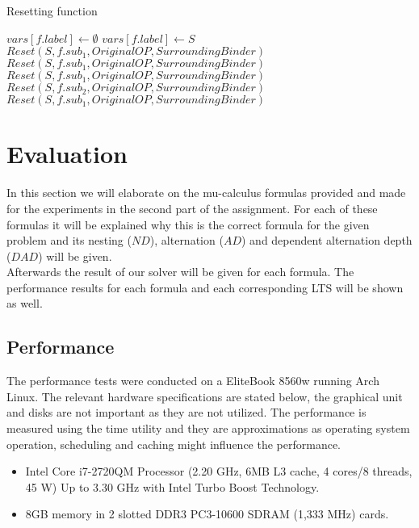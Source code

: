 \documentclass[10pt,a4paper]{article}
\begin{document}
\begin{algorithm}[H]
\caption{Resetting function}\label{alg:reset-proc}
\begin{algorithmic}[1]
					\State $vars[f.label] \gets \emptyset$
				\Else
					\State $vars[f.label] \gets S$
				\EndIf
				\State $Reset(S, f.sub_1, OriginalOP, SurroundingBinder)$
			\Else
				\State $Reset(S, f.sub_1, OriginalOP, SurroundingBinder)$
			\EndIf
		\Else
				\State $Reset(S, f.sub_1, OriginalOP, SurroundingBinder)$
				\State $Reset(S, f.sub_2, OriginalOP, SurroundingBinder)$
				\State $Reset(S, f.sub_1, OriginalOP, SurroundingBinder)$
			\EndIf
		\EndIf
	\EndProcedure
\end{algorithmic}
\end{algorithm}

\section{Evaluation}\label{eval}
In this section we will elaborate on the mu-calculus formulas provided and made for the experiments in the second part of the assignment. For each of these formulas it will be explained why this is the correct formula for the given problem and its nesting ($ND$), alternation ($AD$) and dependent alternation depth ($DAD$) will be given.\\
Afterwards the result of our solver will be given for each formula. The performance results for each formula and each corresponding LTS will be shown as well.

\subsection{Performance}

The performance tests were conducted on a EliteBook 8560w running Arch Linux. The relevant hardware specifications are stated below, the graphical unit and disks are not important as they are not utilized. The performance is measured using the time utility and they are approximations as operating system operation, scheduling and caching might influence the performance.

\begin{itemize}
	\item Intel Core i7-2720QM Processor (2.20 GHz, 6MB L3 cache, 4 cores/8 threads, 45 W) Up to 3.30 GHz with Intel Turbo Boost Technology.
	
	\item 8GB memory in 2 slotted DDR3 PC3-10600 SDRAM (1,333 MHz) cards.
\end{itemize}
\end{document}
